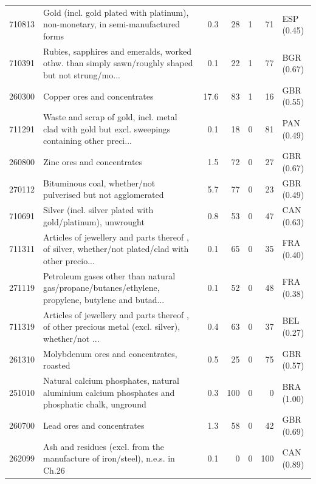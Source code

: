 \begin{tabular}{@{}l p{6.4cm} r r r r l@{}}
710813 & Gold (incl. gold plated with platinum), non-monetary, in semi-manufactured forms & 0.3 & 28 & 1 & 71 & ESP (0.45) \\
710391 & Rubies, sapphires and emeralds, worked othw. than simply sawn/\allowbreak{}roughly shaped but not strung/\allowbreak{}mo... & 0.1 & 22 & 1 & 77 & BGR (0.67) \\
260300 & Copper ores and concentrates & 17.6 & 83 & 1 & 16 & GBR (0.55) \\
711291 & Waste and scrap of gold, incl. metal clad with gold but excl. sweepings containing other preci... & 0.1 & 18 & 0 & 81 & PAN (0.49) \\
260800 & Zinc ores and concentrates & 1.5 & 72 & 0 & 27 & GBR (0.67) \\
270112 & Bituminous coal, whether/\allowbreak{}not pulverised but not agglomerated & 5.7 & 77 & 0 & 23 & GBR (0.49) \\
710691 & Silver (incl. silver plated with gold/\allowbreak{}platinum), unwrought & 0.8 & 53 & 0 & 47 & CAN (0.63) \\
711311 & Articles of jewellery and parts thereof , of silver, whether/\allowbreak{}not plated/\allowbreak{}clad with other precio... & 0.1 & 65 & 0 & 35 & FRA (0.40) \\
271119 & Petroleum gases other than natural gas/\allowbreak{}propane/\allowbreak{}butanes/\allowbreak{}ethylene, propylene, butylene and butad... & 0.1 & 52 & 0 & 48 & FRA (0.38) \\
711319 & Articles of jewellery and parts thereof , of other precious metal (excl. silver), whether/\allowbreak{}not ... & 0.4 & 63 & 0 & 37 & BEL (0.27) \\
261310 & Molybdenum ores and concentrates, roasted & 0.5 & 25 & 0 & 75 & GBR (0.57) \\
251010 & Natural calcium phosphates, natural aluminium calcium phosphates and phosphatic chalk, unground & 0.3 & 100 & 0 & 0 & BRA (1.00) \\
260700 & Lead ores and concentrates & 1.3 & 58 & 0 & 42 & GBR (0.69) \\
262099 & Ash and residues (excl. from the manufacture of iron/\allowbreak{}steel), n.e.s. in Ch.26 & 0.1 & 0 & 0 & 100 & CAN (0.89) \\
\bottomrule
\end{tabular}
